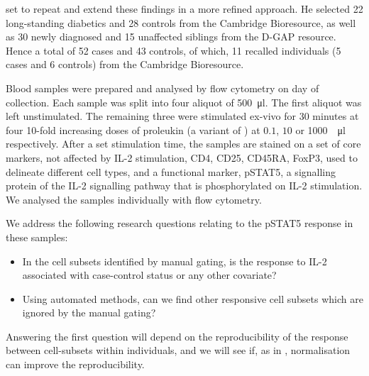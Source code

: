  set to repeat and extend these findings in a more refined approach.
He selected 22 long-standing diabetics and 28 controls from the Cambridge Bioresource, as well as 
30 newly diagnosed and 15 unaffected siblings from the \Gls{D-GAP} resource.  
Hence a total of 52 cases and 43 controls, of which, 11 recalled individuals (5 cases and 6 controls) from the Cambridge Bioresource.


Blood samples were prepared and analysed by flow cytometry on day of collection.
Each sample was split into four aliquot of \SI{500}{\micro\litre}.
The first aliquot was left unstimulated.
The remaining three were stimulated ex-vivo for 30 minutes at four 10-fold increasing doses
of proleukin (a variant of ) at $0.1$, $10$ or \SI{1000}{\unit\per\micro\litre} respectively.
After a set stimulation time, the samples are stained on a set of core markers, not affected by IL-2 stimulation, CD4, CD25, CD45RA, FoxP3,
used to delineate different cell types, and a functional marker, pSTAT5, a signalling protein of the IL-2 signalling pathway
that is phosphorylated on IL-2 stimulation.
We analysed the samples individually with flow cytometry.

We address the following research questions relating to the pSTAT5 response in these samples:
\begin{itemize}
  \item In the cell subsets identified by manual gating, is the response to IL-2 associated with case-control status or any other covariate? 
  \item Using automated methods, can we find other responsive cell subsets which are ignored by the manual gating?
\end{itemize}

Answering the first question will depend on the reproducibility of the response between cell-subsets within individuals,
and we will see if, as in , normalisation can improve the reproducibility.


